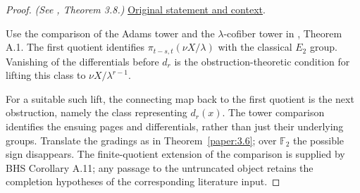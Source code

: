 \begin{proof}
\textit{(See \cite{LWX126}, Theorem 3.8.)} \href{paper/main.tex.html#L813}{Original statement and context}.

Use the comparison of the Adams tower and the $\lambda$-cofiber tower in \cite{BHS}, Theorem A.1. The first quotient identifies $\pi_{t-s,t}(\nu X/\lambda)$ with the classical $E_2$ group. Vanishing of the differentials before $d_r$ is the obstruction-theoretic condition for lifting this class to $\nu X/\lambda^{r-1}$.

For a suitable such lift, the connecting map back to the first quotient is the next obstruction, namely the class representing $d_r(x)$. The tower comparison identifies the ensuing pages and differentials, rather than just their underlying groups. Translate the gradings as in Theorem~\ref{paper:3.6}; over $\mathbb F_2$ the possible sign disappears. The finite-quotient extension of the comparison is supplied by BHS Corollary A.11; any passage to the untruncated object retains the completion hypotheses of the corresponding literature input.
\end{proof}

